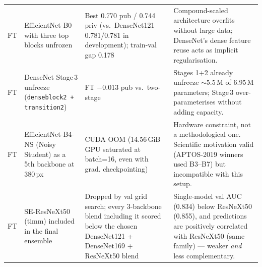 \documentclass[a4paper, 10pt, twocolumn]{article}
\begin{document}
\begin{tabularx}{\textwidth}{@{}p{0.5cm} p{4.0cm} p{3.4cm} X@{}}
FT   & EfficientNet-B0 with three top blocks unfrozen
     & Best 0.770 pub / 0.744 priv (vs.\ DenseNet121 0.781/0.781 in
       development); train-val gap 0.178
     & Compound-scaled architecture overfits without large data;
       DenseNet's dense feature reuse acts as implicit regularisation. \\

FT   & DenseNet Stage\,3 unfreeze (\texttt{denseblock2 + transition2})
     & FT $-$0.013 pub vs.\ two-stage
     & Stages 1+2 already unfreeze $\sim$5.5\,M of 6.95\,M parameters;
       Stage\,3 over-parameterises without adding capacity. \\

FT   & EfficientNet-B4-NS (Noisy Student) as a 5th backbone at 380\,px
     & CUDA OOM (14.56\,GiB GPU saturated at batch=16, even with grad. checkpointing)
     & Hardware constraint, not a methodological one. Scientific motivation
       valid (APTOS-2019 winners used B3--B7) but incompatible with this setup. \\

FT   & SE-ResNeXt50 (timm) included in the final ensemble
     & Dropped by val grid search; every 3-backbone blend including it scored
       below the chosen DenseNet121 + DenseNet169 + ResNeXt50 blend
     & Single-model val AUC (0.834) below ResNeXt50 (0.855), and predictions
       are positively correlated with ResNeXt50 (same family) ---
       weaker \emph{and} less complementary. \\

\bottomrule
\end{tabularx}

\vspace{12pt}
\end{document}
